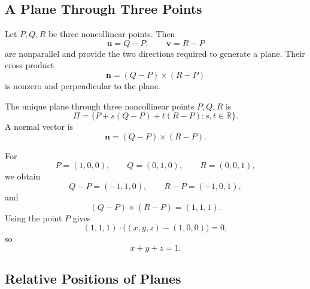 \begin{center}
\end{center}

\subsection{A Plane Through Three Points}

\begin{derivationbox}
Let $P,Q,R$ be three noncollinear points. Then
\[
\mathbf u=Q-P,
\qquad
\mathbf v=R-P
\]
are nonparallel and provide the two directions required to generate a plane.
Their cross product
\[
\mathbf n=(Q-P)\times(R-P)
\]
is nonzero and perpendicular to the plane.
\end{derivationbox}

\begin{theorembox}
The unique plane through three noncollinear points $P,Q,R$ is
\[
\boxed{
\Pi=\{P+s(Q-P)+t(R-P):s,t\in\mathbb R\}
}.
\]
A normal vector is
\[
\boxed{
\mathbf n=(Q-P)\times(R-P)
}.
\]
\end{theorembox}

\begin{examplebox}
For
\[
P=(1,0,0),\qquad Q=(0,1,0),\qquad R=(0,0,1),
\]
we obtain
\[
Q-P=(-1,1,0),\qquad R-P=(-1,0,1),
\]
and
\[
(Q-P)\times(R-P)=(1,1,1).
\]
Using the point $P$ gives
\[
(1,1,1)\cdot\bigl((x,y,z)-(1,0,0)\bigr)=0,
\]
so
\[
\boxed{x+y+z=1}.
\]
\end{examplebox}

\subsection{Relative Positions of Planes}

